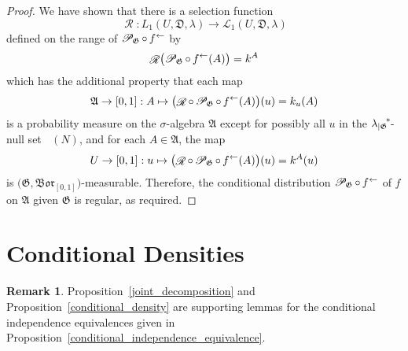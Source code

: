 \documentclass[
twoside=true,
paper=letter,
fontsize=9pt,
pagesize=auto,
leqno,
openany,
headsepline,
overfullrule,
]{scrbook}
\theoremstyle{plain}
\theoremstyle{plain}
\theoremstyle{definition}
\newtheorem{rmk}[thm]{Remark}
\theoremstyle{bfnoteitalic}
\theoremstyle{bfnoteroman}
\newcommand{\sigalg}[1]{\mathfrak{#1}}
\newcommand{\cali}[1]{\mathscr{#1}}
\newcommand{\condprobop}[1]{\mathop{\cali{P}\hspace{-1pt}}\nolimits_{#1}}
\newcommand{\borel}{\mathfrak{Bor}}
\newcommand{\textsigma}{\hbox{\large{$\sigma$}}\kern-1pt}
\newcommand{\restrictedto}[1]{_{\lvert#1}\kern-1.5pt}
\newcommand{\preimage}[1]{\mathop{#1^{\leftarrow}}}
\newcommand{\sigmaalgebra}{\sigalg{A}}
\newcommand{\kernast}{\ast\kern-1pt}
\newcommand{\funcf}{f}
\newcommand{\funcg}{g}
\newcommand{\funck}{k}
\newcommand{\function}{f}
\newcommand{\measlambda}{\lambda}
\newcommand{\seti}{A}
\newcommand{\regular}{\mathop{\cali{R}}}
\newcommand{\uspace}{U}%
\newcommand{\uspaceelt}{u}
\newcommand{\uspacesig}{\sigalg{D}}
\begin{document}
\begin{proof}
We have shown that there is a selection function
\[
\regular:
L_1(\uspace,\uspacesig,\measlambda)
\to
\cali{L}_1(\uspace,\uspacesig,\measlambda)
\]
defined on the range of
$\condprobop{\sigalg{G}}\circ \preimage{\funcf}$
by
\[
\regular\bigl(
\condprobop{\sigalg{G}}\circ \preimage{\funcf}(\seti)
\bigr)
=
\funck^\seti
\]
which has the additional property that each map
\[
\sigmaalgebra\to [0,1]: \seti \mapsto
\bigl( \regular\circ\condprobop{\sigalg{G}} \circ\preimage{\function}
(\seti)\bigr)(\uspaceelt)
= \funck_\uspaceelt(\seti)
\]
is a probability measure on the \textsigma\hyp{}algebra $\sigmaalgebra$ except for possibly all
$\uspaceelt$ in the
${\measlambda\restrictedto{\sigalg{G}}}^\kernast$-null set
$\preimage{\funcg}(N)$,
and for each
$\seti\in\sigmaalgebra$, the map
\[
\uspace\to [0,1] : \uspaceelt\mapsto
\bigl( \regular\circ\condprobop{\sigalg{G}}\circ\preimage{\function}
(\seti)\bigr)(\uspaceelt)
= \funck^\seti(\uspaceelt)
\]
is $\bigl(\sigalg{G}, \borel_{[0,1]}\bigr)$\hyp{}measurable.
Therefore, the conditional distribution
$\condprobop{\sigalg{G}}\circ \preimage{\funcf}$ of $\funcf$ on
$\sigmaalgebra$ given $\sigalg{G}$ is regular, as required.
\end{proof}




\section{Conditional Densities}
\begin{rmk}
Proposition~\ref{joint_decomposition} and Proposition~\ref{conditional_density} are supporting lemmas for the conditional independence equivalences given in Proposition~\ref{conditional_independence_equivalence}.
\end{rmk}
\end{document}
